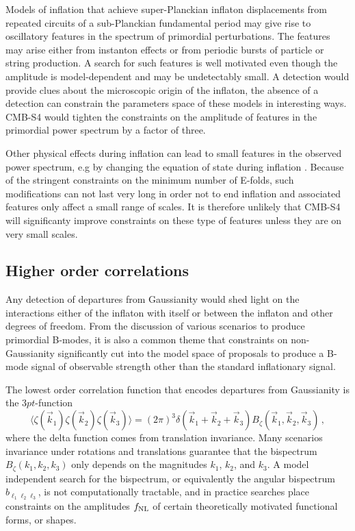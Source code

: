 Models of inflation that achieve super-Planckian inflaton displacements from repeated circuits of a sub-Planckian fundamental period may give rise to oscillatory features in the spectrum of primordial perturbations. The features may arise either from instanton effects or from periodic bursts of particle or string production. A search for such features is well motivated even though the amplitude is model-dependent and may be undetectably small. A detection would provide clues about the microscopic origin of the inflaton, the absence of a detection can constrain the parameters space of these models in interesting ways. CMB-S4 would tighten the constraints on the amplitude of features in the primordial power spectrum by a factor of three. 

Other physical effects during inflation can lead to small features in the observed power spectrum, e.g by changing the equation of state during inflation \cite{}. Because of the stringent constraints on the minimum number of E-folds, such modifications can not last very long in order not to end inflation and associated features only affect a small range of scales. It is therefore unlikely that CMB-S4 will significanty improve constraints on these type of features unless they are on very small scales. 
 
\subsection{Higher order correlations}
Any detection of departures from Gaussianity would shed light on the interactions either of the inflaton with itself or between the inflaton and other degrees of freedom. From the discussion of various scenarios to produce primordial B-modes, it is also a common theme that constraints on non-Gaussianity significantly cut into the model space of proposals to produce a B-mode signal of observable strength other than the standard inflationary signal. 

The lowest order correlation function that encodes departures from Gaussianity is the $3pt$-function
\begin{equation}
\langle\zeta(\vec{k}_1)\zeta(\vec{k}_2)\zeta(\vec{k}_3)\rangle=(2\pi)^3\delta(\vec{k}_1+\vec{k}_2+\vec{k}_3)B_{\zeta}(\vec{k}_1,\vec{k}_2,\vec{k}_3)\,,
\end{equation}
where the delta function comes from translation invariance. Many scenarios invariance under rotations and translations guarantee that the bispectrum $B_{\zeta}(k_1,k_2,k_3)$ only depends on the magnitudes $k_1$, $k_2$, and $k_3$. A model independent search for the bispectrum, or equivalently the angular bispectrum $b_{\ell_1\ell_2\ell_3}$, is not computationally tractable, and in practice searches place constraints on the amplitudes $f_{\rm NL}$ of certain theoretically motivated functional forms, or shapes.

